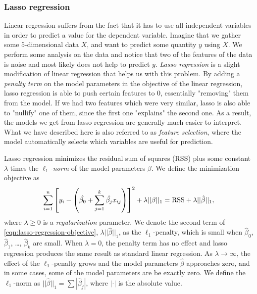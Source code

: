 \subsubsection{Lasso regression}
\label{sec:lasso-regression}
Linear regression suffers from the fact that it has to use all independent variables in order to predict a value for the dependent variable. Imagine that we gather some $5$-dimensional data $X$, and want to predict some quantity $y$ using $X$. We perform some analysis on the data and notice that two of the features of the data is noise and most likely does not help to predict $y$. \textit{Lasso regression} is a slight modification of linear regression that helps us with this problem. By adding a \textit{penalty term} on the model parameters in the objective of the linear regression, lasso regression is able to push certain features to 0, essentially "removing" them from the model. If we had two features which were very similar, lasso is also able to "nullify" one of them, since the first one "explains" the second one. As a result, the models we get from lasso regression are generally much easier to interpret. What we have described here is also referred to as \textit{feature selection}, where the model automatically selects which variables are useful for prediction.

Lasso regression minimizes the residual sum of squares (RSS) plus some constant $\lambda$ times the \textit{$\ell_1$-norm} of the model parameters $\beta$. We define the minimization objective as
\begin{align}
    \sum\limits_{i=1}^{n}{\left[y_i - \left(\hat{\beta_0} +  \sum\limits_{j=1}^{k}{\hat{\beta_j}x_{ij}}\right)\right]^2} + \lambda ||\beta||_1 = \text{RSS} + \lambda ||\hat{\beta}||_1,
    \label{eqn:lasso-regression-objective}
\end{align}
where $\lambda \geq 0$ is a \textit{regularization} parameter. We denote the second term of \cref{eqn:lasso-regression-objective}, $\lambda ||\hat{\beta}||_1$, as the $\ell_1$-penalty, which is small when $\hat{\beta}_0$, $\hat{\beta}_1$, \ldots, $\hat{\beta}_k$ are small. When $\lambda = 0$, the penalty term has no effect and lasso regression produces the same result as standard linear regression. As $\lambda \rightarrow \infty$, the effect of the $\ell_1$-penalty grows and the model parameters $\hat{\beta}$ approaches zero, and in some cases, some of the model parameters are be exactly zero. We define the $\ell_1$-norm as $||\hat{\beta}||_1 = \sum |\hat{\beta}_j|$, where $|\cdot|$ is the absolute value.

